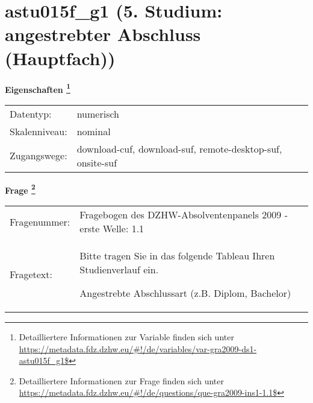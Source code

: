 
    \setcounter{footnote}{0}

    \vspace*{-1.8cm}
	\section{astu015f\_g1 (5. Studium: angestrebter Abschluss (Hauptfach))}
	\label{section:astu015f_g1}



    \vspace*{0.5cm}
    \noindent\textbf{Eigenschaften
	\footnote{Detailliertere Informationen zur Variable finden sich unter
		\url{https://metadata.fdz.dzhw.eu/\#!/de/variables/var-gra2009-ds1-astu015f_g1$}}}\\
	\begin{tabularx}{\hsize}{@{}lX}
	Datentyp: & numerisch \\
	Skalenniveau: & nominal \\
	Zugangswege: &
	  download-cuf, 
	  download-suf, 
	  remote-desktop-suf, 
	  onsite-suf
 \\
    \end{tabularx}



				\vspace*{0.5cm}
                \noindent\textbf{Frage
	                \footnote{Detailliertere Informationen zur Frage finden sich unter
		              \url{https://metadata.fdz.dzhw.eu/\#!/de/questions/que-gra2009-ins1-1.1$}}}\\
				\begin{tabularx}{\hsize}{@{}lX}
					Fragenummer: &
					  Fragebogen des DZHW-Absolventenpanels 2009 - erste Welle:
					  1.1
 \\
					Fragetext: & Bitte tragen Sie in das folgende Tableau Ihren Studienverlauf ein.\par  Angestrebte Abschlussart (z.B. Diplom, Bachelor) \\
				\end{tabularx}





